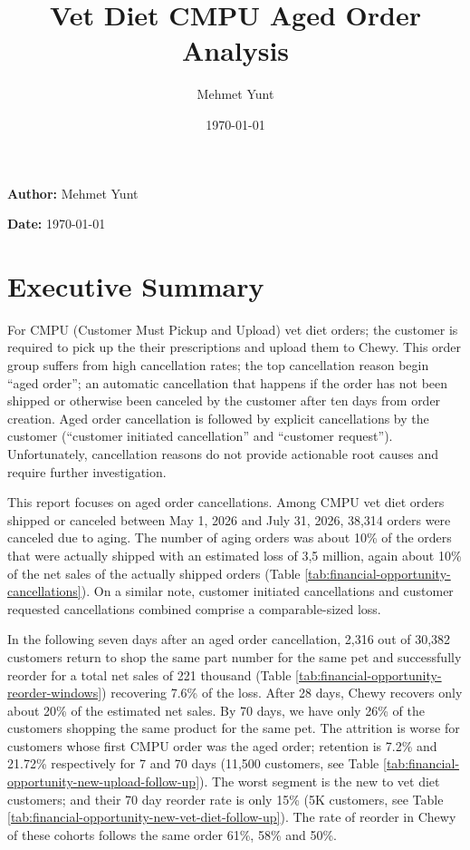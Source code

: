 \documentclass[
  10pt,
]{article}
\title{Vet Diet CMPU Aged Order Analysis}
\author{Mehmet Yunt}
\date{\today}
\newif\ifreportfinal
\begin{document}
\thispagestyle{plain}
\ifreportfinal\else
{}\par\smallskip
\fi
{}\par
\noindent\textbf{Author:} Mehmet Yunt\par
\noindent\textbf{Date:} \today\par\medskip
\section{Executive Summary}\label{abstract}

For CMPU (Customer Must Pickup and Upload) vet diet orders; the
customer is required to pick up the their prescriptions and upload
them to Chewy. This order group suffers from high cancellation rates;
the top cancellation reason begin ``aged order''; an automatic
cancellation that happens if the order has not been shipped or
otherwise been canceled by the customer after ten days from order
creation. Aged order cancellation is followed by explicit
cancellations by the customer (``customer initiated cancellation'' and
``customer request''). Unfortunately, cancellation reasons
do not provide actionable root causes and require further
investigation.

This report focuses on aged order cancellations. Among CMPU vet diet
orders shipped or canceled between May 1, 2026 and July 31, 2026,
38,314 orders were canceled due to aging. The number of aging orders
was about 10\% of the orders that were actually shipped with an
estimated loss of 3,5 million, again about 10\% of the net sales of
the actually shipped orders (Table
\ref{tab:financial-opportunity-cancellations}). On a similar note,
customer initiated cancellations and customer requested cancellations
combined comprise a comparable-sized loss.

In the following seven days after an aged order
cancellation, 2,316 out of 30,382 customers return to shop the same
part number for the same pet and successfully reorder for a total net
sales of 221 thousand (Table
\ref{tab:financial-opportunity-reorder-windows}) recovering 7.6\% of
the loss. After 28 days, Chewy recovers only about 20\% of the
estimated net sales. By 70 days, we have only 26\% of the customers
shopping the same product for the same pet. The attrition is worse for
customers whose first CMPU order was the aged order; retention is
7.2\% and 21.72\% respectively for 7 and 70 days (11,500 customers,
see Table \ref{tab:financial-opportunity-new-upload-follow-up}).  The
worst segment is the new to vet diet customers; and their 70 day
reorder rate is only 15\% (5K customers, see Table
\ref{tab:financial-opportunity-new-vet-diet-follow-up}). The rate of
reorder in Chewy of these cohorts follows the same order 61\%, 58\%
and 50\%.
\end{document}

